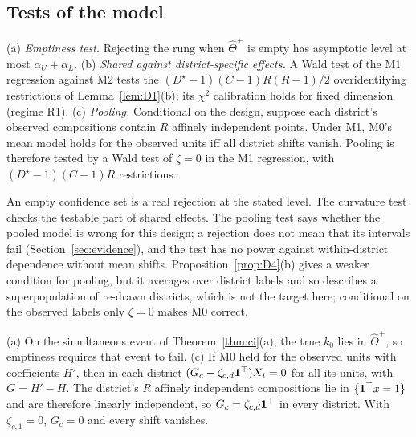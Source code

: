 \subsection{Tests of the model}\label{sec:tests}

\begin{proposition}[Tests]\label{prop:tests}
(a)  \emph{Emptiness test.} Rejecting the rung when $\hat\Theta^+$ is
empty has asymptotic level at most $\alpha_U+\alpha_L$.
(b)  \emph{Shared against district-specific
effects.} A Wald test of the M1 regression against M2 tests the
$(D^\star-1)(C-1)R(R-1)/2$ overidentifying restrictions of Lemma~\ref{lem:D1}(b);
its $\chi^2$ calibration holds for fixed dimension (regime R1).
(c)  \emph{Pooling.} Conditional on the design, suppose each
district's observed compositions contain $R$ affinely independent points. Under
M1, M0's mean model holds for the observed units iff all district shifts vanish.
Pooling is therefore tested by a Wald test of $\zeta=0$ in the M1 regression, with
$(D^\star-1)(C-1)R$ restrictions.
\end{proposition}
\begin{reading}
An empty confidence set is a real rejection at the stated level. The curvature
test checks the testable part of shared effects. The pooling test says whether the
pooled model is wrong for this design; a rejection does not mean that its
intervals fail (Section~\ref{sec:evidence}), and the test has no power against
within-district dependence without mean shifts. Proposition~\ref{prop:D4}(b) gives a
weaker condition for pooling, but it averages over district labels and so
describes a superpopulation of re-drawn districts, which is not the target here;
conditional on the observed labels only $\zeta=0$ makes M0 correct.
\end{reading}
\begin{sketch}
(a) On the simultaneous event of Theorem~\ref{thm:ci}(a), the true $k_0$ lies in
$\hat\Theta^+$, so emptiness requires that event to fail. (c) If M0 held for the
observed units with coefficients $H'$, then in each district
$(G_c-\zeta_{c,d}\mathbf 1^\top)X_i=0$ for all its units, with $G=H'-H$. The district's
$R$ affinely independent compositions lie in $\{\mathbf 1^\top x=1\}$ and are therefore
linearly independent, so $G_c=\zeta_{c,d}\mathbf 1^\top$ in every district. With
$\zeta_{c,1}=0$, $G_c=0$ and every shift vanishes.
\end{sketch}

